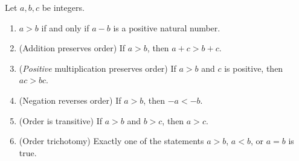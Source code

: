 \begin{lemma}  \label{lem 4.1.11}
Let \(a, b, c\) be integers.
\begin{enumerate}
    \item \(a > b\) if and only if \(a - b\) is a positive natural number.
    \item (Addition preserves order) If \(a > b\), then \(a + c > b+ c\).
    \item (\emph{Positive} multiplication preserves order) If \(a > b\) and \(c\) is positive, then \(ac > bc\).
    \item (Negation reverses order) If \(a > b\), then \(-a < -b\).
    \item (Order is transitive) If \(a > b\) and \(b > c\), then \(a > c\).
    \item (Order trichotomy) Exactly one of the statements \(a > b\), \(a < b\), or \(a = b\) is true.
\end{enumerate}
\end{lemma}

